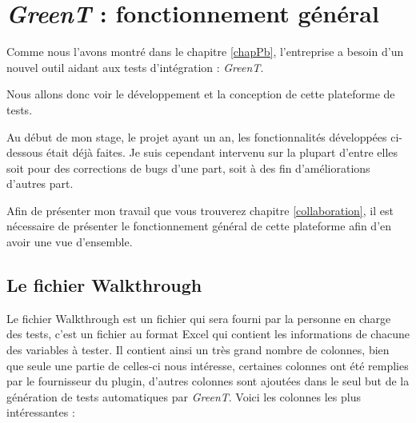 \chapter{\textit{GreenT} : fonctionnement général}\label{chapGreent}
\putminitoc

Comme nous l'avons montré dans le chapitre \ref{chapPb}, l'entreprise a besoin d'un nouvel outil aidant aux tests d'intégration : \textit{GreenT}. 

Nous allons donc voir le développement et la conception de cette plateforme de tests.

Au début de mon stage, le projet ayant un an, les fonctionnalités développées ci-dessous était déjà faites. Je suis cependant intervenu
sur la plupart d'entre elles soit pour des corrections de bugs d'une part, soit à des fin d'améliorations d'autres part.

Afin de présenter mon travail que vous trouverez chapitre \ref{collaboration}, il est nécessaire de présenter le fonctionnement général de
cette plateforme afin d'en avoir une vue d'ensemble.

\section{Le fichier Walkthrough}\label{wt}
Le fichier Walkthrough est un fichier qui sera fourni par la personne en charge des tests, c'est un fichier au format Excel qui contient les informations
de chacune des variables à tester. Il contient ainsi un très grand nombre de colonnes, bien que seule une partie de celles-ci nous
intéresse, certaines colonnes ont été remplies par le fournisseur du plugin, d'autres colonnes sont ajoutées dans le seul but de la
génération de tests automatiques par \textit{GreenT}. Voici les colonnes les plus intéressantes : 

